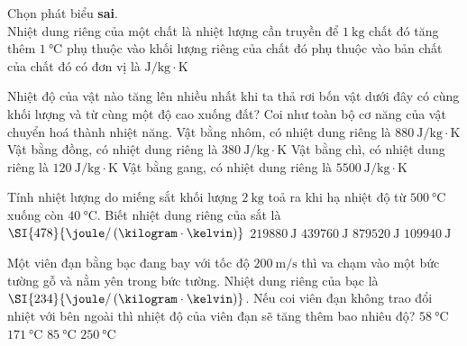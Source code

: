 \begin{ex}
	Chọn phát biểu \textbf{sai}.\\
	Nhiệt dung riêng của một chất 
	\choice
	{là nhiệt lượng cần truyền để $\SI{1}{\kilogram}$ chất đó tăng thêm $\SI{1}{\celsius}$}
	{\True phụ thuộc vào khối lượng riêng của chất đó}
	{phụ thuộc vào bản chất của chất đó}
	{có đơn vị là $\si{\joule/\kilogram\cdot\kelvin}$}
	\loigiai{}
\end{ex}
\begin{ex}
Nhiệt độ của vật nào tăng lên nhiều nhất khi ta thả rơi bốn vật dưới đây có cùng khối lượng và từ cùng một độ cao xuống đất? Coi như toàn bộ cơ năng của vật chuyển hoá thành nhiệt năng.
	\choice
	{Vật bằng nhôm, có nhiệt dung riêng là $\SI{880}{\joule/\kilogram\cdot\kelvin}$}
	{Vật bằng đồng, có nhiệt dung riêng là $\SI{380}{\joule/\kilogram\cdot\kelvin}$}
	{\True Vật bằng chì, có nhiệt dung riêng là $\SI{120}{\joule/\kilogram\cdot\kelvin}$}
	{Vật bằng gang, có nhiệt dung riêng là $\SI{5500}{\joule/\kilogram\cdot\kelvin}$}
\end{ex}
\begin{ex}
	Tính nhiệt lượng do miếng sắt khối lượng $\SI{2}{\kilogram}$ toả ra khi hạ nhiệt độ từ $\SI{500}{\celsius}$ xuống còn $\SI{40}{\celsius}$. Biết nhiệt dung riêng của sắt là $\SI{478}{\joule/\left(\kilogram\cdot\kelvin\right)}$
	\choice
	{$\SI{219880}{\joule}$}
	{\True $\SI{439760}{\joule}$}
	{$\SI{879520}{\joule}$}
	{$\SI{109940}{\joule}$}
\end{ex}
\begin{ex}
	Một viên đạn bằng bạc đang bay với tốc độ $\SI{200}{\meter/\second}$ thì va chạm vào một bức tường gỗ và nằm yên trong bức tường. Nhiệt dung riêng của bạc là $\SI{234}{\joule/\left(\kilogram\cdot\kelvin\right)}$. Nếu coi viên đạn không trao đổi nhiệt với bên ngoài thì nhiệt độ của viên đạn sẽ tăng thêm bao nhiêu độ?
	\choice
	{$\SI{58}{\celsius}$}
	{$\SI{171}{\celsius}$}
	{\True $\SI{85}{\celsius}$}
	{$\SI{250}{\celsius}$}
\end{ex}
